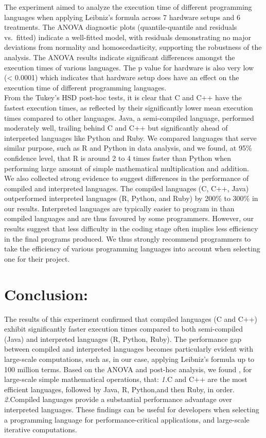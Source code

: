 \documentclass[12pt,halfline,a4paper,]{ouparticle}
\begin{document}
The experiment aimed to analyze the execution time of different
programming languages when applying Leibniz's formula across 7 hardware
setups and 6 treatments. The ANOVA diagnostic plots (quantile-quantile
and residuals vs.~fitted) indicate a well-fitted model, with residuals
demonstrating no major deviations from normality and homoscedasticity,
supporting the robustness of the analysis. The ANOVA results indicate
significant differences amongst the execution times of various
languages. The p value for hardware is also very low (\textless{}
0.0001) which indicates that hardware setup does have an effect on the
execution time of different programming languages.\\
From the Tukey's HSD post-hoc tests, it is clear that C and C++ have the
fastest execution times, as reflected by their significantly lower mean
execution times compared to other languages. Java, a semi-compiled
language, performed moderately well, trailing behind C and C++ but
significantly ahead of interpreted languages like Python and Ruby. We
compared languages that serve similar purpose, such as R and Python in
data analysis, and we found, at 95\% confidence level, that R is around
2 to 4 times faster than Python when performing large amount of simple
mathematical multiplication and addition.\\
We also collected strong evidence to suggest differences in the
performance of compiled and interpreted languages. The compiled
languages (C, C++, Java) outperformed interpreted languages (R, Python,
and Ruby) by 200\% to 300\% in our results. Interpreted languages are
typically easier to program in than compiled languages and are thus
favoured by some programmers. However, our results suggest that less
difficulty in the coding stage often implies less efficiency in the
final programs produced. We thus strongly recommend programmers to take
the efficiency of various programming languages into account when
selecting one for their project.

\hypertarget{conclusion}{%
\section{Conclusion:}\label{conclusion}}

The results of this experiment confirmed that compiled languages (C and
C++) exhibit significantly faster execution times compared to both
semi-compiled (Java) and interpreted languages (R, Python, Ruby). The
performance gap between compiled and interpreted languages becomes
particularly evident with large-scale computations, such as, in our
case, applying Leibniz's formula up to 100 million terms. Based on the
ANOVA and post-hoc analysis, we found , for large-scale simple
mathematical operations, that: \emph{1.}C and C++ are the most efficient
languages, followed by Java, R, Python,and then Ruby, in order.
\emph{2.}Compiled languages provide a substantial performance advantage
over interpreted languages. These findings can be useful for developers
when selecting a programming language for performance-critical
applications, and large-scale iterative computations.
\end{document}
